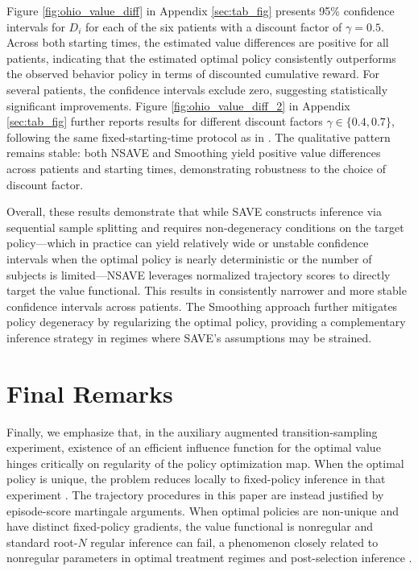 \documentclass[12pt]{article}
\theoremstyle{remark}\newtheorem{remark}[theorem]{Remark}\theoremstyle{plain}
\begin{document}
Figure \ref{fig:ohio_value_diff} in Appendix \ref{sec:tab_fig} presents 95\% confidence intervals for $D_i$ for each of the six patients with a discount factor of $\gamma=0.5$.
Across both starting times, the estimated value differences are positive for all patients, indicating that the estimated optimal policy consistently outperforms the observed behavior policy in terms of discounted cumulative reward.
For several patients, the confidence intervals exclude zero, suggesting statistically significant improvements.
Figure \ref{fig:ohio_value_diff_2}  in Appendix \ref{sec:tab_fig} further reports results for different discount factors $\gamma \in \{0.4,0.7\}$, following the same fixed-starting-time protocol as in \cite{shi2022off}.
The qualitative pattern remains stable: both NSAVE and Smoothing yield positive value differences across patients and starting times, demonstrating robustness to the choice of discount factor.

Overall, these results demonstrate that while SAVE constructs inference via sequential sample splitting and requires non-degeneracy conditions on the target policy—which in practice can yield relatively wide or unstable confidence intervals when the optimal policy is nearly deterministic or the number of subjects is limited—NSAVE leverages normalized trajectory scores to directly target the value functional. This results in consistently narrower and more stable confidence intervals across patients.
The Smoothing approach further mitigates policy degeneracy by regularizing the optimal policy, providing a complementary inference strategy in regimes where SAVE's assumptions may be strained.
\fi

\section{Final Remarks}\label{sec:final}


Finally, we emphasize that, in the auxiliary augmented
transition-sampling experiment, existence of an efficient influence
function for the optimal value hinges critically on regularity of the
policy optimization map.  When the optimal policy is unique, the
problem reduces locally to fixed-policy inference in that experiment
\citep{uehara2022review,shi2025statistical}.  The trajectory
procedures in this paper are instead justified by episode-score
martingale arguments.
When optimal policies are non-unique and have distinct fixed-policy
gradients, the value functional is nonregular and standard root-$N$
regular inference can fail, a phenomenon closely related to
nonregular parameters in optimal treatment regimes and post-selection
inference \citep{laber2014dynamic,whitehouse2025inference}.
\end{document}
